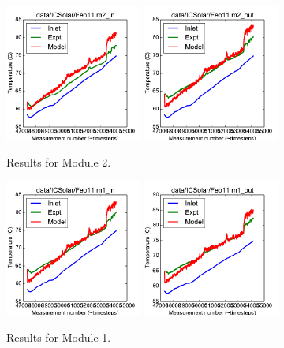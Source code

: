 \documentclass{article}
\begin{document}
\clearpage
\begin{figure}[!ht]
\centering
\includegraphics[width=0.4\textwidth]{../../data/ICSolar/images/Feb11_m2_in_unsteady.pdf}\hspace{0.05\textwidth}
\includegraphics[width=0.4\textwidth]{../../data/ICSolar/images/Feb11_m2_out_unsteady.pdf}\hspace{0.05\textwidth}\\
\caption{Results for Module 2.}\end{figure}
\begin{figure}[!ht]
\centering
\includegraphics[width=0.4\textwidth]{../../data/ICSolar/images/Feb11_m1_in_unsteady.pdf}\hspace{0.05\textwidth}
\includegraphics[width=0.4\textwidth]{../../data/ICSolar/images/Feb11_m1_out_unsteady.pdf}\hspace{0.05\textwidth}\\
\caption{Results for Module 1.}\end{figure}
\end{document}
